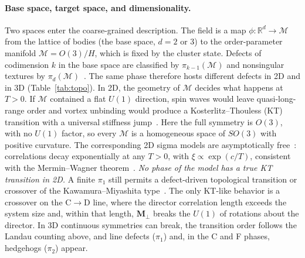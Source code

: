 \documentclass[pre,twocolumn,superscriptaddress,amsmath,amssymb,floatfix]{revtex4-2}
\begin{document}
\paragraph*{Base space, target space, and dimensionality.} Two spaces enter the coarse-grained description. The field is a map $\phi:\mathbb{R}^d\to\mathcal M$ from the lattice of bodies (the base space, $d=2$ or 3) to the order-parameter manifold $\mathcal M=O(3)/H$, which is fixed by the cluster state. Defects of codimension $k$ in the base space are classified by $\pi_{k-1}(\mathcal M)$ and nonsingular textures by $\pi_d(\mathcal M)$~\cite{Mermin1979}. The same phase therefore hosts different defects in 2D and in 3D (Table~\ref{tab:topo}). In 2D, the geometry of $\mathcal M$ decides what happens at $T>0$. If $\mathcal M$ contained a flat $U(1)$ direction, spin waves would leave quasi-long-range order and vortex unbinding would produce a Kosterlitz--Thouless (KT) transition with a universal stiffness jump~\cite{KosterlitzThouless1973,NelsonKosterlitz1977}. Here the full symmetry is $O(3)$, with no $U(1)$ factor, so every $\mathcal M$ is a homogeneous space of $SO(3)$ with positive curvature. The corresponding 2D sigma models are asymptotically free~\cite{Polyakov1975}: correlations decay exponentially at any $T>0$, with $\xi\propto\exp(c/T)$, consistent with the Mermin--Wagner theorem~\cite{MerminWagner1966}. \emph{No phase of the model has a true KT transition in 2D.} A finite $\pi_1$ still permits a defect-driven topological transition or crossover of the Kawamura--Miyashita type~\cite{KawamuraMiyashita1984}. The only KT-like behavior is a crossover on the C$\to$D line, where the director correlation length exceeds the system size and, within that length, $\mathbf M_\perp$ breaks the $U(1)$ of rotations about the director. In 3D continuous symmetries can break, the transition order follows the Landau counting above, and line defects ($\pi_1$) and, in the C and F phases, hedgehogs ($\pi_2$) appear.
\end{document}
